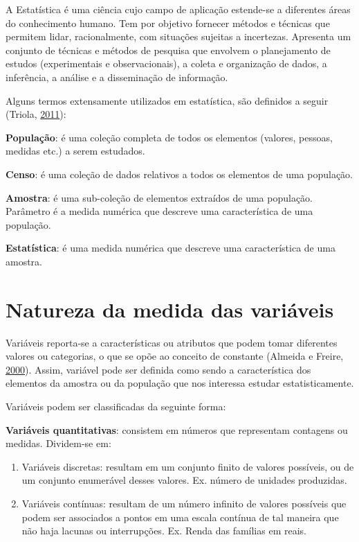 \documentclass[12pt,brazil,oneside]{book}
\begin{document}
A Estatística é uma ciência cujo campo de aplicação estende-se a diferentes áreas do conhecimento humano. Tem por objetivo fornecer métodos e técnicas que permitem lidar, racionalmente, com situações sujeitas a incertezas. Apresenta um conjunto de técnicas e métodos de pesquisa que envolvem o planejamento de estudos (experimentais e observacionais), a coleta e organização de dados, a inferência, a análise e a disseminação de informação.

Alguns termos extensamente utilizados em estatística, são definidos a seguir (Triola, \protect\hyperlink{ref-triola1999}{2011}):

\textbf{População}: é uma coleção completa de todos os elementos (valores, pessoas, medidas etc.) a serem estudados.

\textbf{Censo}: é uma coleção de dados relativos a todos os elementos de uma população.

\textbf{Amostra}: é uma sub-coleção de elementos extraídos de uma população.
Parâmetro é a medida numérica que descreve uma característica de uma população.

\textbf{Estatística}: é uma medida numérica que descreve uma característica de uma amostra.

\hypertarget{natureza-da-medida-das-variaveis}{%
\section{Natureza da medida das variáveis}\label{natureza-da-medida-das-variaveis}}

Variáveis reporta-se a características ou atributos que podem tomar diferentes valores ou categorias, o que se opõe ao conceito de constante (Almeida e Freire, \protect\hyperlink{ref-almeida2000}{2000}). Assim, variável pode ser definida como sendo a característica dos elementos da amostra ou da população que nos interessa estudar estatisticamente.

Variáveis podem ser classificadas da seguinte forma:

\textbf{Variáveis quantitativas}: consistem em números que representam contagens ou medidas. Dividem-se em:

\begin{enumerate}
\def\labelenumi{\alph{enumi})}
\item
  Variáveis discretas: resultam em um conjunto finito de valores possíveis, ou de um conjunto enumerável desses valores. Ex. número de unidades produzidas.
\item
  Variáveis contínuas: resultam de um número infinito de valores possíveis que podem ser associados a pontos em uma escala contínua de tal maneira que não haja lacunas ou interrupções. Ex. Renda das famílias em reais.
\end{enumerate}
\end{document}
